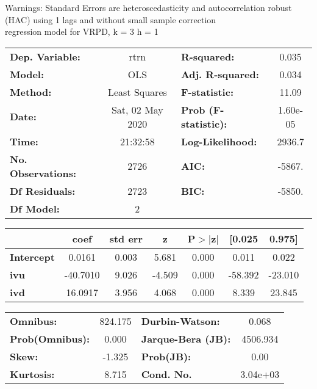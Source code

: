 Warnings: \newline
 [1] Standard Errors are heteroscedasticity and autocorrelation robust (HAC) using 1 lags and without small sample correction\\ 

regression model for VRPD, k = 3 h = 1\begin{center}
\begin{tabular}{lclc}
\toprule
\textbf{Dep. Variable:}    &       rtrn       & \textbf{  R-squared:         } &     0.035   \\
\textbf{Model:}            &       OLS        & \textbf{  Adj. R-squared:    } &     0.034   \\
\textbf{Method:}           &  Least Squares   & \textbf{  F-statistic:       } &     11.09   \\
\textbf{Date:}             & Sat, 02 May 2020 & \textbf{  Prob (F-statistic):} &  1.60e-05   \\
\textbf{Time:}             &     21:32:58     & \textbf{  Log-Likelihood:    } &    2936.7   \\
\textbf{No. Observations:} &        2726      & \textbf{  AIC:               } &    -5867.   \\
\textbf{Df Residuals:}     &        2723      & \textbf{  BIC:               } &    -5850.   \\
\textbf{Df Model:}         &           2      & \textbf{                     } &             \\
\bottomrule
\end{tabular}
\begin{tabular}{lcccccc}
                   & \textbf{coef} & \textbf{std err} & \textbf{z} & \textbf{P$> |$z$|$} & \textbf{[0.025} & \textbf{0.975]}  \\
\midrule
\textbf{Intercept} &       0.0161  &        0.003     &     5.681  &         0.000        &        0.011    &        0.022     \\
\textbf{ivu}       &     -40.7010  &        9.026     &    -4.509  &         0.000        &      -58.392    &      -23.010     \\
\textbf{ivd}       &      16.0917  &        3.956     &     4.068  &         0.000        &        8.339    &       23.845     \\
\bottomrule
\end{tabular}
\begin{tabular}{lclc}
\textbf{Omnibus:}       & 824.175 & \textbf{  Durbin-Watson:     } &    0.068  \\
\textbf{Prob(Omnibus):} &   0.000 & \textbf{  Jarque-Bera (JB):  } & 4506.934  \\
\textbf{Skew:}          &  -1.325 & \textbf{  Prob(JB):          } &     0.00  \\
\textbf{Kurtosis:}      &   8.715 & \textbf{  Cond. No.          } & 3.04e+03  \\
\bottomrule
\end{tabular}
\end{center}

